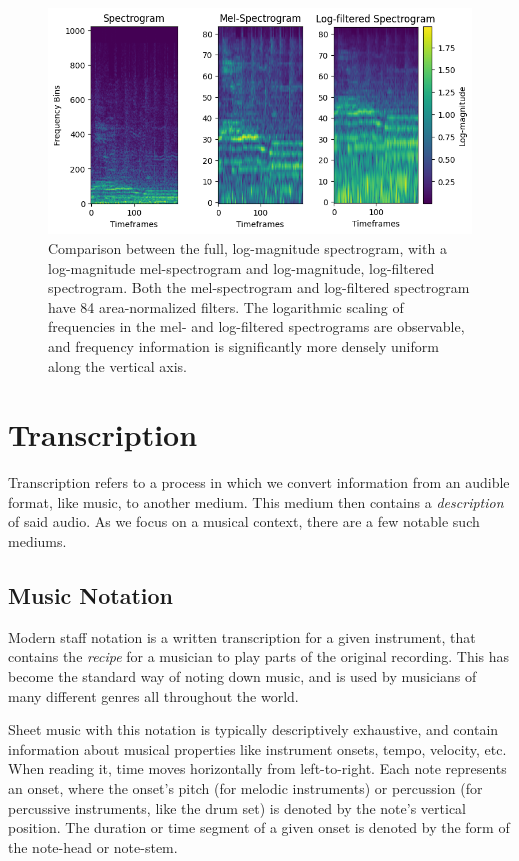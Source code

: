\begin{figure}[H]
    \centering
    \hspace*{-0.6cm}
    \includegraphics[scale=0.9]{figures/allspectrograms}
    \caption{Comparison between the full, log-magnitude spectrogram, with a log-magnitude mel-spectrogram and log-magnitude, log-filtered spectrogram. Both the mel-spectrogram and log-filtered spectrogram have 84 area-normalized filters. The logarithmic scaling of frequencies in the mel- and log-filtered spectrograms are observable, and frequency information is significantly more densely uniform along the vertical axis.}
    \label{AllSpectrogramFigure}
\end{figure}


\section{Transcription}

Transcription refers to a process in which we convert information from an audible format, like music, to another medium. This medium then contains a \textit{description} of said audio. As we focus on a musical context, there are a few notable such mediums.

\subsection{Music Notation}

Modern staff notation is a written transcription for a given instrument, that contains the \textit{recipe} for a musician to play parts of the original recording. This has become the standard way of noting down music, and is used by musicians of many different genres all throughout the world.

Sheet music with this notation is typically descriptively exhaustive, and contain information about musical properties like instrument onsets, tempo, velocity, etc. When reading it, time moves horizontally from left-to-right. Each note represents an onset, where the onset's pitch (for melodic instruments) or percussion (for percussive instruments, like the drum set) is denoted by the note's vertical position. The duration or time segment of a given onset is denoted by the form of the note-head or note-stem.

